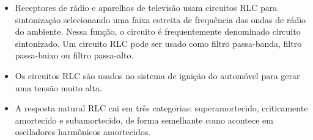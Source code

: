 \begin{itemize}
\item Receptores de rádio e aparelhos de televisão usam circuitos RLC para sintonização selecionando uma faixa estreita de frequência das ondas de rádio do ambiente. Nessa função, o circuito é frequentemente denominado circuito sintonizado. Um circuito RLC pode ser usado como filtro passa-banda, filtro passa-baixo ou filtro passa-alto. 
\item Os circuitos RLC são usados no sistema de ignição do automóvel para gerar uma tensão muito alta.
\item A resposta natural RLC cai em três categorias: superamortecido, criticamente amortecido e subamortecido, de forma semelhante como acontece em osciladores harmônicos amortecidos.
\end{itemize}